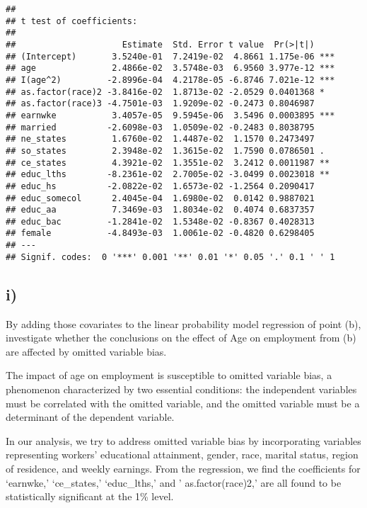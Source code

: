 \documentclass[
]{article}
\begin{document}
\begin{verbatim}
## 
## t test of coefficients:
## 
##                     Estimate  Std. Error t value  Pr(>|t|)    
## (Intercept)       3.5240e-01  7.2419e-02  4.8661 1.175e-06 ***
## age               2.4866e-02  3.5748e-03  6.9560 3.977e-12 ***
## I(age^2)         -2.8996e-04  4.2178e-05 -6.8746 7.021e-12 ***
## as.factor(race)2 -3.8416e-02  1.8713e-02 -2.0529 0.0401368 *  
## as.factor(race)3 -4.7501e-03  1.9209e-02 -0.2473 0.8046987    
## earnwke           3.4057e-05  9.5945e-06  3.5496 0.0003895 ***
## married          -2.6098e-03  1.0509e-02 -0.2483 0.8038795    
## ne_states         1.6760e-02  1.4487e-02  1.1570 0.2473497    
## so_states         2.3948e-02  1.3615e-02  1.7590 0.0786501 .  
## ce_states         4.3921e-02  1.3551e-02  3.2412 0.0011987 ** 
## educ_lths        -8.2361e-02  2.7005e-02 -3.0499 0.0023018 ** 
## educ_hs          -2.0822e-02  1.6573e-02 -1.2564 0.2090417    
## educ_somecol      2.4045e-04  1.6980e-02  0.0142 0.9887021    
## educ_aa           7.3469e-03  1.8034e-02  0.4074 0.6837357    
## educ_bac         -1.2841e-02  1.5348e-02 -0.8367 0.4028313    
## female           -4.8493e-03  1.0061e-02 -0.4820 0.6298405    
## ---
## Signif. codes:  0 '***' 0.001 '**' 0.01 '*' 0.05 '.' 0.1 ' ' 1
\end{verbatim}

\hypertarget{i-3}{%
\subsection{i)}\label{i-3}}

By adding those covariates to the linear probability model regression of
point (b), investigate whether the conclusions on the effect of Age on
employment from (b) are affected by omitted variable bias. \vspace{1em}

The impact of age on employment is susceptible to omitted variable bias,
a phenomenon characterized by two essential conditions: the independent
variables must be correlated with the omitted variable, and the omitted
variable must be a determinant of the dependent variable.

In our analysis, we try to address omitted variable bias by
incorporating variables representing workers' educational attainment,
gender, race, marital status, region of residence, and weekly earnings.
From the regression, we find the coefficients for `earnwke,'
`ce\_states,' `educ\_lths,' and ' as.factor(race)2,' are all found to be
statistically significant at the 1\% level.
\end{document}
